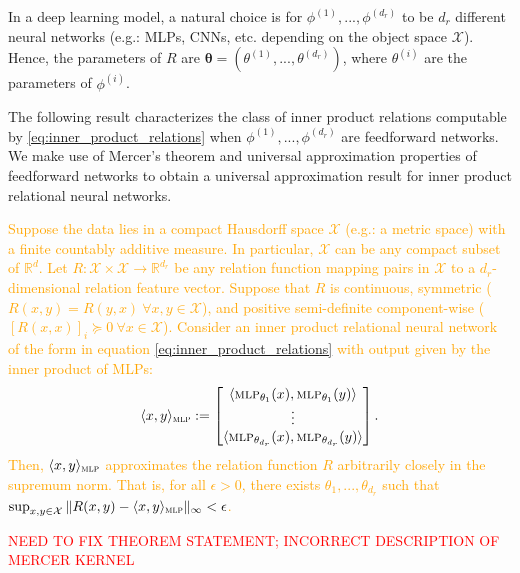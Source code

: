 In a deep learning model, a natural choice is for $\phi^{(1)}, ..., \phi^{(d_r)}$ to be $d_r$ different neural networks (e.g.: MLPs, CNNs, etc. depending on the object space $\mathcal{X}$). Hence, the parameters of $R$ are $\boldsymbol{\theta} = (\theta^{(1)}, ..., \theta^{(d_r)})$, where $\theta^{(i)}$ are the parameters of $\phi^{(i)}$.

The following result characterizes the class of inner product relations computable by \eqref{eq:inner_product_relations} when $\phi^{(1)}, ..., \phi^{(d_r)}$ are feedforward networks. We make use of Mercer's theorem and universal approximation properties of feedforward networks to obtain a universal approximation result for inner product relational neural networks.

\textcolor{orange}{
\begin{thm}
	\label{thm:universal_approx_inner_product_relnn}
	\hphantom{~}
	Suppose the data lies in a compact Hausdorff space $\mathcal{X}$ (e.g.: a metric space) with a finite countably additive measure. In particular, $\mathcal{X}$ can be any compact subset of $\mathbb{R}^d$. Let $R: \mathcal{X} \times \mathcal{X} \to \mathbb{R}^{d_r}$ be any relation function mapping pairs in $\mathcal{X}$ to a $d_r$-dimensional relation feature vector. Suppose that $R$ is continuous, symmetric ($R(x,y) = R(y,x) \ \forall x,y \in \mathcal{X}$), and positive semi-definite component-wise ($[R(x,x)]_i \succeq 0 \ \forall x \in \mathcal{X}$). Consider an inner product relational neural network of the form in equation \eqref{eq:inner_product_relations} with output given by the inner product of MLPs:
	\begin{equation*}
		\langle x, y \rangle_{\MLP} := \begin{bmatrix}\langle \MLP_{\theta_1}(x), \MLP_{\theta_1}(y) \rangle \\ \vdots \\ \langle \MLP_{\theta_{d_r}}(x), \MLP_{\theta_{d_r}}(y) \rangle\end{bmatrix}.
	\end{equation*}
	Then, $\langle x, y \rangle_{\text{\sc mlp}}$ approximates the relation function $R$ arbitrarily closely in the supremum norm. That is, for all $\epsilon > 0$, there exists $\theta_1, ..., \theta_{d_r}$ such that $\sup_{x,y \in \mathcal{X}}{\lVert R(x,y) - \langle x, y \rangle_{\text{\sc mlp}} \rVert_\infty} < \epsilon$.
\end{thm}
}

\textcolor{red}{NEED TO FIX THEOREM STATEMENT; INCORRECT DESCRIPTION OF MERCER KERNEL}


